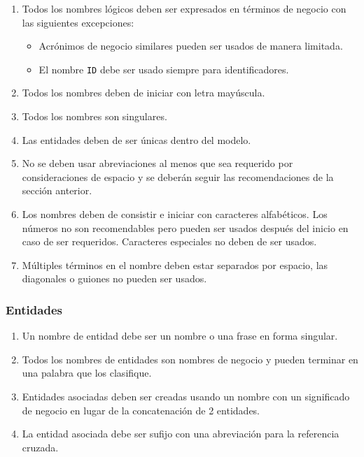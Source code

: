 \begin{enumerate}

\item Todos los nombres lógicos deben ser expresados en términos de negocio con
  las siguientes excepciones:

  \begin{itemize}
  \item Acrónimos de negocio similares pueden ser usados de manera limitada.
  \item El nombre \texttt{ID} debe ser usado siempre para identificadores.
  \end{itemize}

\item Todos los nombres deben de iniciar con letra mayúscula.

\item Todos los nombres son singulares.

\item Las entidades deben de ser únicas dentro del modelo.

\item No se deben usar abreviaciones al menos que sea requerido por
  consideraciones de espacio y se deberán seguir las recomendaciones de la
  sección anterior.

\item Los nombres deben de consistir e iniciar con caracteres alfabéticos. Los
  números no son recomendables pero pueden ser usados después del inicio en caso
  de ser requeridos. Caracteres especiales no deben de ser usados.

\item Múltiples términos en el nombre deben estar separados por espacio, las
  diagonales o guiones no pueden ser usados.

\end{enumerate}

\subsubsection{Entidades}

\begin{enumerate}

\item Un nombre de entidad debe ser un nombre o una frase en forma singular.

\item Todos los nombres de entidades son nombres de negocio y pueden terminar en
  una palabra que los clasifique.

\item Entidades asociadas deben ser creadas usando un nombre con un significado
  de negocio en lugar de la concatenación de 2 entidades.

\item La entidad asociada debe ser sufijo con una abreviación para la referencia
  cruzada.

\end{enumerate}

